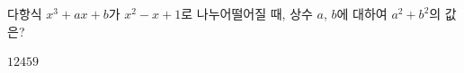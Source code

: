 다항식 $x^3+ax+b$가 $x^2-x+1$로 나누어떨어질 때, 상수 $a$, $b$에 대하여 $a^2+b^2$의 값은?
\begin{choices32}{$1$}{$2$}{$4$}{$5$}{$9$}\end{choices32}
